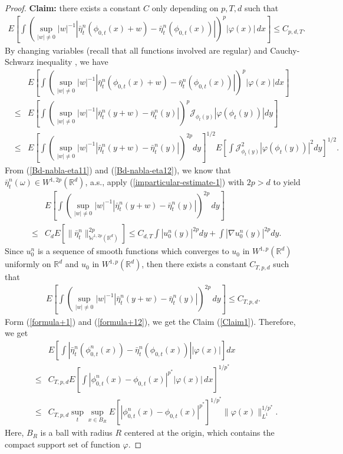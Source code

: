 \documentclass[12pt,oneside, reqno]{amsart}
\newcommand{\be}{\begin{eqnarray}}
\newcommand{\ee}{\end{eqnarray}}
\newcommand{\ce}{\begin{eqnarray*}}
\newcommand{\de}{\end{eqnarray*}}
\def\no{\nonumber}
\def\cJ{{\mathcal J}}
\def\mR{{\mathbb R}}
\def\mW{{\mathbb W}}
\def\leq{\leqslant}
\numberwithin{equation}{section}
\begin{document}
\begin{proof}
  \textbf{Claim:} there exists a constant $C$ only depending on $p,T,d$ such that 
   \be\label{Claim1}
  E\left[\int\left(\sup_{|w|\neq 0}|w|^{-1}\left|\bar\eta_t^n(\phi_{0,t}(x)+w)-\bar\eta_t^n(\phi_{0,t}(x))\right|\right)^p|\varphi(x)|\,dx\right]\leq C_{p,d,T} .
   \ee 
   By changing variables (recall that all functions involved are regular) and Cauchy-Schwarz inequality , we have 
   \ce 
   &&E\left[\int\left(\sup_{|w|\neq 0}|w|^{-1}\left|\bar\eta_t^n(\phi_{0,t}(x)+w)-\bar\eta_t^n(\phi_{0,t}(x))\right|\right)^p|\varphi(x)|dx\right]\\
   &\leq &E\left[\int\left(\sup_{|w|\neq 0}|w|^{-1}\left|\bar\eta_t^n(y+w)-\bar\eta_t^n(y)\right|\right)^p\cJ_{\phi_{t}(y)}|\varphi(\phi_{t}(y))|dy\right]\\
    &\leq &E\left[\int\left(\sup_{|w|\neq 0}|w|^{-1}\left|\bar\eta_t^n(y+w)-\bar\eta_t^n(y)\right|\right)^{2p}dy\right]^{1/2}E\left[\int\cJ_{\phi_{t}(y)}^2|\varphi(\phi_{t}(y))|^{2} dy\right]^{1/2}.
   \de 
   From (\ref{Bd-nabla-eta11}) and (\ref{Bd-nabla-eta12}), we know that $\bar\eta_t^n(\omega)\in W^{1,2p}(\mR^d)$, a.s., apply (\ref{imparticular-estimate-1}) with $2p>d$ to yield
   \ce 
   &&E\left[\int\left(\sup_{|w|\neq 0}|w|^{-1}\left|\bar\eta_t^n(y+w)-\bar\eta_t^n(y)\right|\right)^{2p}\,dy\right]\\
   &\leq &C_{d} E\left[\|\bar\eta_t^n\|_{\mW^{1,2p}(\mR^d)}^{2p}\right]\leq C_{d,T}  \int |u_0^n(y)|^{2p}dy+\int |\nabla u_0^n(y)|^{2p}dy.
   \de 
Since $u_0^n$ is a sequence of smooth functions which converges to $u_0$ in $W^{1,p}(\mR^d)$ uniformly on $\mR^d$ and $u_0$ in $W^{1,p}(\mR^d)$, then there exists a constant $C_{T,p,d}$ such that
\be\label{formula+1}
 E\left[\int\left(\sup_{|w|\neq 0}|w|^{-1}\left|\bar\eta_t^n(y+w)-\bar\eta_t^n(y)\right|\right)^{2p}\,dy\right]\leq C_{T,p,d}.
\ee
Form (\ref{formula+1}) and (\ref{formula+12}), we get the Claim (\ref{Claim1}). Therefore, we get 
\be\label{formula+12+1} 
&&E\left[\int \left|\bar\eta_t^n(\phi_{0,t}^n(x))-\bar\eta_t^n(\phi_{0,t}(x))\right||\varphi(x)| \right]dx\no\\
&\leq& C_{T,p,d}E\left[\int|\phi_{0,t}^n(x)-\phi_{0,t}(x)|^{p^*}|\varphi(x)|\,dx\right]^{1/p^*}\no\\
&\leq& C_{T,p,d}\sup_t\sup_{x\in B_R} E\left[|\phi_{0,t}^n(x)-\phi_{0,t}(x)|^{p^*}\right]^{1/{p^*}}\|\varphi(x)\|_{L^{1}}^{1/{p^*}}.
\ee 
Here, $B_R$ is a ball with radius $R$ centered at the origin, which contains the compact support set of function $\varphi$.


\end{proof}
\end{document}
